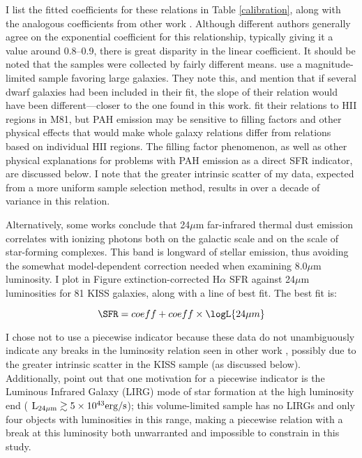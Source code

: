 I list the fitted coefficients for these relations in Table \ref{calibration}, along with the analogous coefficients from other work \citep{Wu,PerezGonzalez}. Although different authors generally agree on the exponential coefficient for this relationship, typically giving it a value around 0.8--0.9, there is great disparity in the linear coefficient. It should be noted that the samples were collected by fairly different means. \cite{Wu} use a magnitude-limited sample favoring large galaxies. They note this, and mention that if several dwarf galaxies had been included in their fit, the slope of their relation would have been different---closer to the one found in this work. \cite{PerezGonzalez} fit their relations to HII regions in M81, but PAH emission may be sensitive to filling factors and other physical effects that would make whole galaxy relations differ from relations based on individual HII regions. The filling factor phenomenon, as well as other physical explanations for problems with PAH emission as a direct SFR indicator, are discussed below. I note that the greater intrinsic scatter of my data, expected from a more uniform sample selection method, results in over a decade of variance in this relation.

Alternatively, some works \citep{AlonsoHerrero,PerezGonzalez,Calzetti2005} conclude that 24$\mu$m far-infrared thermal dust emission correlates with ionizing photons both on the galactic scale and on the scale of star-forming complexes. This band is longward of stellar emission, thus avoiding the somewhat model-dependent correction needed when examining 8.0$\mu$m luminosity. I plot in Figure  extinction-corrected H$\alpha$ SFR against 24$\mu$m luminosities for 81 KISS galaxies, along with a line of best fit. The best fit is:

\begin{equation}
\SFR = \fit{sfr_24micron}{bdb} + \fit{sfr_24micron}{bdb}\times \logL{24\mu m}
\end{equation}

I chose not to use a piecewise indicator because these data do not unambiguously indicate any breaks in the luminosity relation seen in other work \citep[][etc.]{Wu,Calzetti2010}, possibly due to the greater intrinsic scatter in the KISS sample (as discussed below).  Additionally, \cite{Calzetti2010} point out that one motivation for a piecewise indicator is the Luminous Infrared Galaxy (LIRG) mode of star formation at the high luminosity end ( $\rm{L}_{24\mu\rm{m}}\gtrsim  5\times10^{43}\rm{erg/s}$); this volume-limited sample has no LIRGs and only four objects with luminosities in this range, making a piecewise relation with a break at this luminosity both unwarranted and impossible to constrain in this study.


